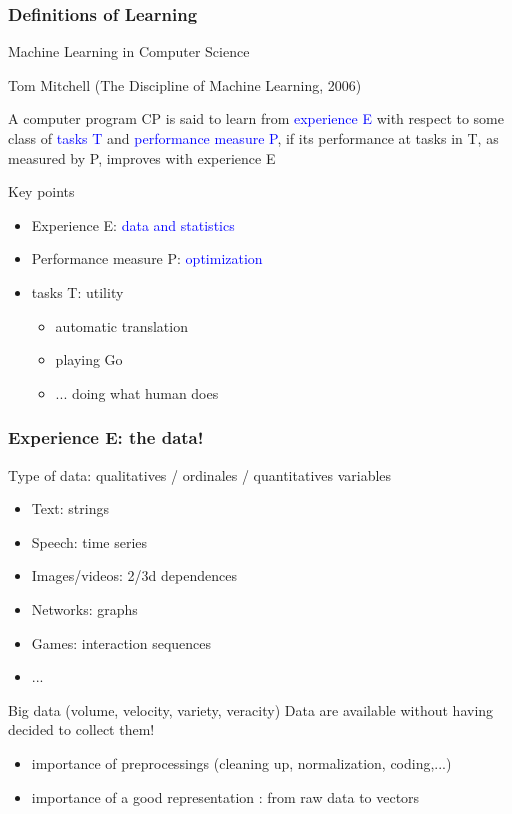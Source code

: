\documentclass[pressentation,9pt,aspectratio=1610,xcolor=table]{beamer}
\renewenvironment{description}{\begin{itemize}}{\end{itemize}}
\newcommand{\structuretext}[1]{{\textcolor{blue}{#1}}}
\begin{document}
\begin{frame}
  \frametitle{Definitions of Learning}
  
  \begin{block}{Machine Learning in Computer Science}
    
    Tom Mitchell (The Discipline of Machine Learning, 2006)
    \medskip
    
    A computer program CP is said to learn from \structuretext{experience E} with respect to
    some class of \structuretext{tasks T} and \structuretext{performance measure P}, if its performance at
    tasks in T, as measured by P, improves with experience E 
  \end{block}
    
    
  \begin{block}{Key points}
    \begin{itemize}
    \item<2-> Experience E:  \structuretext{data and statistics}
    \item<3-> Performance measure P: \structuretext{optimization}
    \item<4-> tasks T: utility 
      \begin{itemize}
      \item automatic translation
      \item playing Go
      \item ... doing what human does
      \end{itemize}
    \end{itemize}
    
  \end{block}    
\end{frame}

\begin{frame}
  \frametitle{Experience E: the data!}
  
  \begin{block}{Type of data:  qualitatives / ordinales / quantitatives variables}
    \begin{description}
    \item Text:  strings
    \item Speech: time series
    \item Images/videos: 2/3d dependences 
    \item Networks: graphs
    \item Games: interaction sequences
    \item ...
    \end{description}
  \end{block}
  
  \begin{block}{Big data (volume, velocity, variety, veracity)}
    Data are available without having decided to collect them!
    \begin{itemize}
    \item importance of preprocessings (cleaning up, normalization, coding,...)
    \item importance of a good representation : from raw data to vectors
    \end{itemize}
  \end{block}
\end{frame}
\end{document}
